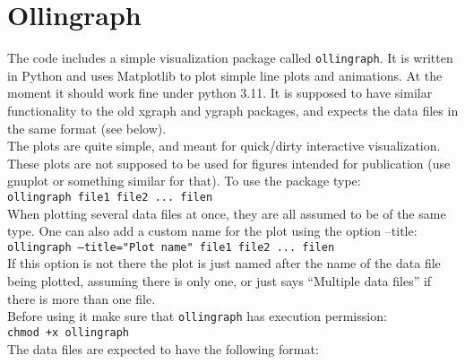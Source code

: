 \documentclass[12pt]{article}
\begin{document}

\section{Ollingraph}
\label{sec:ollingraph}

The code includes a simple visualization package called
\texttt{ollingraph}.  It is written in Python and uses Matplotlib to
plot simple line plots and animations.  At the moment it should work
fine under python 3.11. It is supposed to have similar functionality
to the old xgraph and ygraph packages, and expects the data files in
the same format (see below). \\

The plots are quite simple, and meant for quick/dirty interactive
visualization.  These plots are not supposed to be used for figures
intended for publication (use gnuplot or something similar for
that). To use the package type: \\

\texttt{ollingraph  file1 file2 ... filen} \\

When plotting several data files at once, they are all assumed to be
of the same type.  One can also add a custom name for the plot using
the option --title: \\

\texttt{ollingraph --title="Plot name" file1 file2 ... filen} \\

If this option is not there the plot is just named after the name of
the data file being plotted, assuming there is only one, or just says
``Multiple data files'' if there is more than one file. \\

Before using it make sure that \texttt{ollingraph} has execution
permission: \\

\texttt{chmod +x ollingraph} \\

The data files are expected to have the following format:
\end{document}
